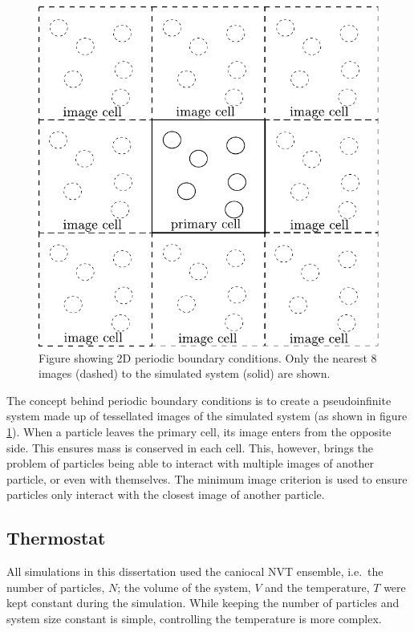 \documentclass[12pt]{UoAthesis}
\begin{document}
\begin{figure}[htp] 
  \begin{center}
    \includegraphics[clip, scale = 0.8]{figures/PBC} 
    \caption{\label{fig:PBC} Figure showing 2D periodic boundary
      conditions. Only the nearest 8 images (dashed) to the simulated
      system (solid) are shown.}
  \end{center}
\end{figure}

The concept behind periodic boundary conditions is to create a
pseudoinfinite system made up of tessellated images of the simulated
system (as shown in figure \ref{fig:PBC}).  When a particle leaves the
primary cell, its image enters from the opposite side.  This ensures
mass is conserved in each cell.  This, however, brings the problem of
particles being able to interact with multiple images of another
particle, or even with themselves.  The minimum image criterion is
used to ensure particles only interact with the closest image of
another particle.


\subsection{Thermostat}

All simulations in this dissertation used the caniocal NVT ensemble,
i.e.\ the number of particles, $N$; the volume of the system, $V$ and
the temperature, $T$ were kept constant during the simulation.  While
keeping the number of particles and system size constant is simple,
controlling the temperature is more complex.  
\end{document}
